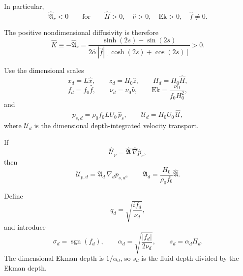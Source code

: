 \documentclass[10pt]{amsart}
\begin{document}
In particular,
\begin{equation}
\widehat{\mathfrak A}_r<0
\qquad
\text{for}
\qquad
\widehat H>0,\quad
\widehat\nu>0,\quad
\mathrm{Ek}>0,\quad
\widehat f\neq0.
\end{equation}

The positive nondimensional diffusivity is therefore
\begin{equation}
\widehat K
\equiv
-\widehat{\mathfrak A}_r
=
\frac{
\sinh(2s)-\sin(2s)
}{
2\widehat\alpha\,|\widehat f|
\left[\cosh(2s)+\cos(2s)\right]
}
>0.
\end{equation}



Use the dimensional scales
\begin{equation}
x_d=L\widehat x,
\qquad
z_d=H_0\widehat z,
\qquad
H_d=H_0\widehat H,
\end{equation}
\begin{equation}
f_d=f_0\widehat f,
\qquad
\nu_d=\nu_0\widehat\nu,
\qquad
\mathrm{Ek}
=
\frac{\nu_0}{f_0H_0^2},
\end{equation}
and
\begin{equation}
p_{s,d}
=
\rho_0 f_0 L U_0\,\widehat p_s,
\qquad
\boldsymbol{\mathcal U}_d
=
H_0U_0\,\widehat{\boldsymbol{\mathcal U}},
\end{equation}
where \(\boldsymbol{\mathcal U}_d\) is the dimensional
depth-integrated velocity transport.

If
\begin{equation}
\widehat{\boldsymbol{\mathcal U}}_p
=
\widehat{\mathfrak A}\,
\widehat\nabla\widehat p_s,
\end{equation}
then
\begin{equation}
\boldsymbol{\mathcal U}_{p,d}
=
\mathfrak A_d\,\nabla_d p_{s,d},
\qquad
\mathfrak A_d
=
\frac{H_0}{\rho_0 f_0}
\widehat{\mathfrak A}.
\end{equation}

Define 
\begin{equation}
q_d
=
\sqrt{\frac{if_d}{\nu_d}},
\end{equation}
and introduce
\begin{equation}
\sigma_d=\operatorname{sgn}(f_d),
\qquad
\alpha_d
=
\sqrt{\frac{|f_d|}{2\nu_d}},
\qquad
s_d=\alpha_dH_d.
\end{equation}
The dimensional Ekman depth is $1/\alpha_d$, so $s_d$ is the fluid depth divided by the Ekman depth.
\end{document}

